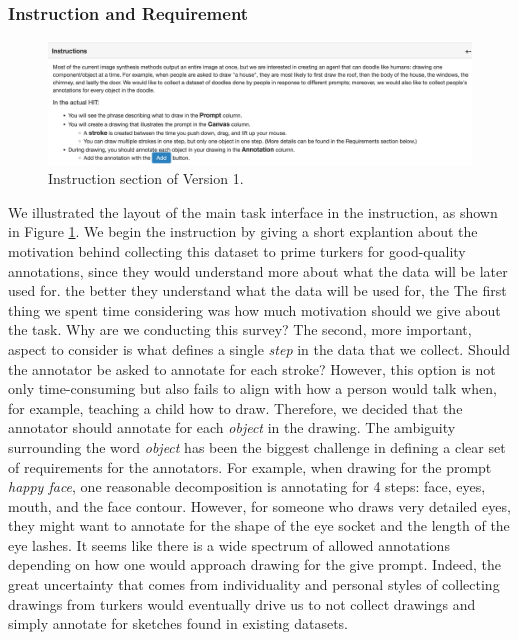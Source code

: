 \subsubsection{Instruction and Requirement}

\begin{figure}[!htb]    
\includegraphics[width=\linewidth]{data_collection/v1_instruction.png} 
\caption{Instruction section of Version 1.}
\label{v1.instruction}
\end{figure}

We illustrated the layout of the main task interface in the instruction, as shown in Figure \ref{v1.instruction}. We begin the instruction by giving a short explantion about the motivation behind collecting this dataset to prime turkers for good-quality annotations, since they would understand more about what the data will be later used for.   
the better they understand what the data will be used for, the    
The first thing we spent time considering was how much motivation should we give about the task. Why are we conducting this survey? 
The second, more important, aspect to consider is what defines a single \textit{step} in the data that we collect. Should the annotator be asked to annotate for each stroke? However, this option is not only time-consuming but also fails to align with how a person would talk when, for example, teaching a child how to draw. Therefore, we decided that the annotator should annotate for each \textit{object} in the drawing. The ambiguity surrounding the word \textit{object} has been the biggest challenge in defining a clear set of requirements for the annotators. For example, when drawing for the prompt \textit{happy face}, one reasonable decomposition is annotating for 4 steps: face, eyes, mouth, and the face contour. However, for someone who draws very detailed eyes, they might want to annotate for the shape of the eye socket and the length of the eye lashes. It seems like there is a wide spectrum of allowed annotations depending on how one would approach drawing for the give prompt. Indeed, the great uncertainty that comes from individuality and personal styles of collecting drawings from turkers would eventually drive us to not collect drawings and simply annotate for sketches found in existing datasets.                    

